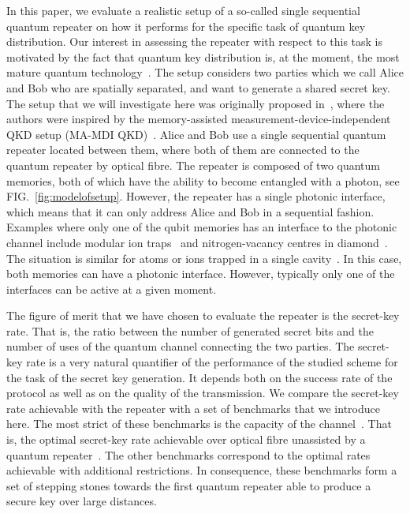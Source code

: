 \documentclass[aps,pra,reprint,superscriptaddress]{revtex4-1}
\begin{document}
In this paper, we evaluate a realistic setup of a so-called single sequential quantum repeater on how it performs for the specific task of quantum key distribution. Our interest in assessing the repeater with respect to this task is motivated by the fact that quantum key distribution is, at the moment, the most mature quantum technology~\cite{scarani2009security}. 
The setup considers two parties which we call Alice and Bob who are spatially separated, and want to generate a shared secret key. The setup that we will investigate here was originally proposed in~\cite{luong2015overcoming}, where the authors were inspired by the memory-assisted measurement-device-independent QKD setup (MA-MDI QKD)~\cite{panayi2014memory}.
Alice and Bob use a single sequential quantum repeater located between them, where both of them are connected to the quantum repeater by optical fibre. The repeater is composed of two quantum memories, both of which have the ability to become entangled with a photon, see FIG.~\ref{fig:modelofsetup}. However, the repeater has a single photonic interface, which means that it can only address Alice and Bob in a sequential fashion. 
Examples where only one of the qubit memories has an interface to the photonic channel include modular ion traps~\cite{hucul2015modular} and nitrogen-vacancy centres in diamond~\cite{blok2015towards, reiserer2016robust, gao2015coherent}. 
The situation is similar for atoms or ions trapped in a single cavity~\cite{reiserer2015cavity}. In this case, both memories can have a photonic interface. However, typically only one of the interfaces can be active at a given moment.


The figure of merit that we have chosen to evaluate the repeater is the secret-key rate. That is, the ratio between the number of generated secret bits and the number of uses of the quantum channel connecting the two parties. The secret-key rate is a very natural quantifier of the performance of the studied scheme for the task of the secret key generation. It depends both on the success rate of the protocol as well as on the quality of the transmission. We compare the secret-key rate achievable with the repeater with a set of benchmarks that we introduce here. The most strict of these benchmarks is the capacity of the channel~\cite{wilde2013quantum}. That is, the optimal secret-key rate achievable over optical fibre unassisted by a quantum repeater~\cite{pirandola2015fundamental}. The other benchmarks correspond to the optimal rates achievable with additional restrictions. 
In consequence, these benchmarks form a set of stepping stones towards the first quantum repeater able to produce a secure key over large distances.
\end{document}
